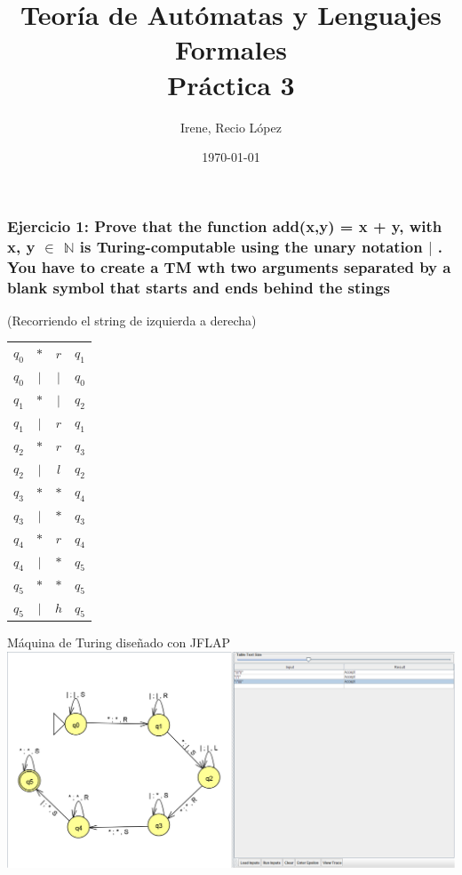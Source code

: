 \documentclass[fleqn, 10pt]{article}
\title{Teoría de Autómatas y Lenguajes Formales\\[.4\baselineskip]Práctica 3}
\author{Irene, Recio López}
\date{\today}
\theoremstyle{plain}
\theoremstyle{definition}
\begin{document}
\maketitle

\subsubsection*{Ejercicio 1: Prove that the function add(x,y) = x + y, with x, y $\in$ $\mathbb{N}$ is Turing-computable using the unary notation $|$ . You have to create a TM wth two arguments separated by a blank symbol that starts and ends behind the stings}
(Recorriendo el string de izquierda a derecha)

\begin{table}[h!]
\begin{tabular}{c c c c}
$q_0$ & $*$ & $r$  & $q_1$
\\
$q_0$ & $|$ & $|$  & $q_0$
\\
\hline
$q_1$ & $*$ & $|$  & $q_2$
\\
$q_1$ & $|$ & $r$  & $q_1$
\\
\hline
$q_2$ & $*$ & $r$  & $q_3$
\\
$q_2$ & $|$ & $l$  & $q_2$
\\
\hline
$q_3$ & $*$ & $*$  & $q_4$
\\
$q_3$ & $|$ & $*$  & $q_3$
\\
\hline
$q_4$ & $*$ & $r$  & $q_4$
\\
$q_4$ & $|$ & $*$  & $q_5$
\\
\hline
$q_5$ & $*$ & $*$  & $q_5$
\\
$q_5$ & $|$ & $h$  & $q_5$
\\
\end{tabular}
\end{table}
\begin{center}
Máquina de Turing diseñado con JFLAP
\\
	\includegraphics[scale=0.19]{ejercicio1MTresult}
\end{center}
\end{document}
